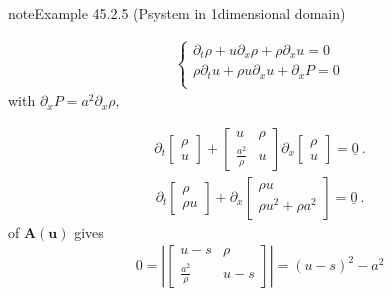 \documentclass[letterpaper,10pt,english]{jupyterBook}
\begin{document}
\begin{sphinxadmonition}{note}{Example 45.2.5 (P\sphinxhyphen{}system in 1\sphinxhyphen{}dimensional domain)}


\begin{equation*}
\begin{split}\begin{cases}
 \partial_t \rho + u \partial_x \rho + \rho \partial_x u = 0 \\
 \rho \partial_t u + \rho u \partial_x u + \partial_x P = 0 \\
\end{cases}\end{split}
\end{equation*}
\sphinxAtStartPar
with \(\partial_x P = a^2 \partial_x \rho\),

\sphinxAtStartPar
{}
\begin{equation*}
\begin{split}\partial_t \begin{bmatrix} \rho \\ u \end{bmatrix} + \begin{bmatrix} u & \rho \\ \frac{a^2}{\rho} & u \end{bmatrix} \partial_x \begin{bmatrix} \rho \\ u \end{bmatrix} = \underline{0} \ .\end{split}
\end{equation*}
\sphinxAtStartPar
{}
\begin{equation*}
\begin{split}\partial_t \begin{bmatrix} \rho \\ \rho u \end{bmatrix} + \partial_x \begin{bmatrix} \rho u \\ \rho u^2 + \rho a^2 \end{bmatrix} = \underline{0} \ .\end{split}
\end{equation*}
\sphinxAtStartPar
{} of \(\mathbf{A}(\mathbf{u})\) gives
\begin{equation*}
\begin{split}0 = \left| \begin{bmatrix} u - s & \rho \\ \frac{a^2}{\rho} & u - s \end{bmatrix} \right| = (u - s)^2  - a^2\end{split}

\end{equation*}
\end{sphinxadmonition}
\end{document}
